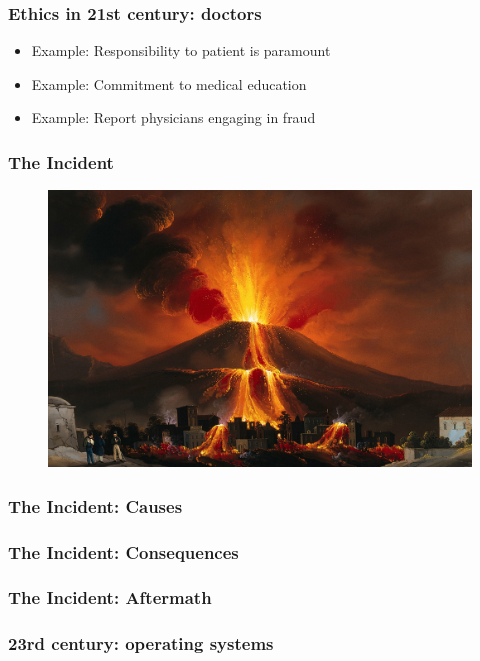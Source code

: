 \begin{frame}[fragile]
\frametitle{Ethics in 21st century: doctors}

\begin{itemize}
\item Example: Responsibility to patient is paramount
\item Example: Commitment to medical education
\item Example: Report physicians engaging in fraud
\end{itemize}

\end{frame}

\begin{frame}[fragile]
\frametitle{The Incident}

\begin{figure}
\includegraphics[scale=0.1]{volcano}
\end{figure}

\end{frame}

\begin{frame}[fragile]
\frametitle{The Incident: Causes}

\end{frame}

\begin{frame}[fragile]
\frametitle{The Incident: Consequences}

\end{frame}

\begin{frame}[fragile]
\frametitle{The Incident: Aftermath}

\end{frame}

\begin{frame}[fragile]
\frametitle{23rd century: operating systems}

\end{frame}

